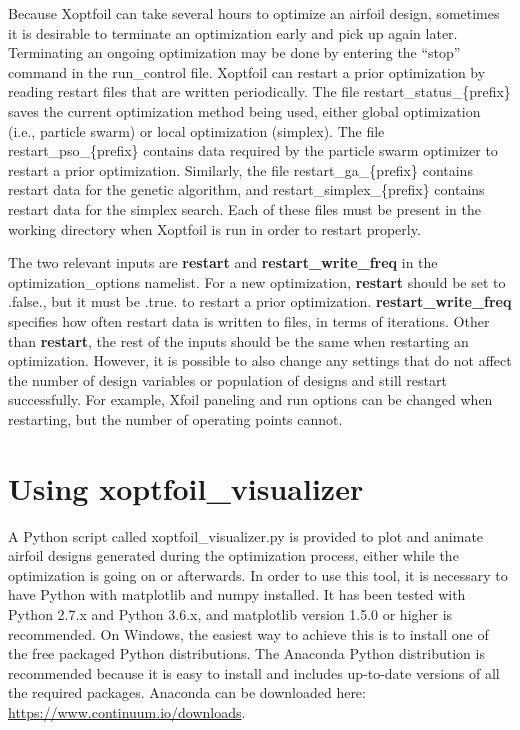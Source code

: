 \documentclass[11pt]{article}
\begin{document}
Because Xoptfoil can take several hours to optimize an airfoil design, sometimes it is
desirable to terminate an optimization early and pick up again later. Terminating an
ongoing optimization may be done by entering the ``stop'' command in the run\_control
file. Xoptfoil can restart a prior optimization
by reading restart files that are written periodically. The file
restart\_status\_\{prefix\}
saves the current optimization method being used, either global optimization (i.e.,
particle swarm) or local optimization (simplex).  The file restart\_pso\_\{prefix\} contains
data required by the particle swarm optimizer to restart a prior optimization. Similarly,
the file restart\_ga\_\{prefix\} contains restart data for the genetic algorithm,
and restart\_simplex\_\{prefix\} contains restart data for the simplex search.
Each of these files must be
present in the working directory when Xoptfoil is run in order to restart properly.

The two relevant inputs are \textbf{restart} and \textbf{restart\_write\_freq} in the
optimization\_options namelist.  For a new optimization, \textbf{restart} should be set to
.false., but it must be .true. to restart a prior optimization.
\textbf{restart\_write\_freq} specifies how often restart data is written to files, in
terms of iterations.  Other than \textbf{restart}, the rest of the inputs should be the
same when restarting an optimization.  However, it is possible to also change any settings
that do not affect the number of design variables or population of designs and still
restart successfully.  For example, Xfoil paneling and run options can be changed when
restarting, but the number of operating points cannot. 

\section{Using xoptfoil\_visualizer}\label{sec:xoptfoil_visualizer}

A Python script called xoptfoil\_visualizer.py is provided to plot and animate airfoil
designs generated during the optimization process, either while the optimization is going
on or afterwards.  In order to use this tool, it is
necessary to have Python with matplotlib and numpy installed. It has been tested with
Python 2.7.x and Python 3.6.x, and matplotlib version 1.5.0 or higher is recommended.
On Windows, the easiest
way to achieve this is to install one of the free packaged Python distributions.  The
Anaconda Python distribution is recommended because it is easy to install and includes
up-to-date versions of all the required packages.  Anaconda can be downloaded here:
\url{https://www.continuum.io/downloads}.
\end{document}
